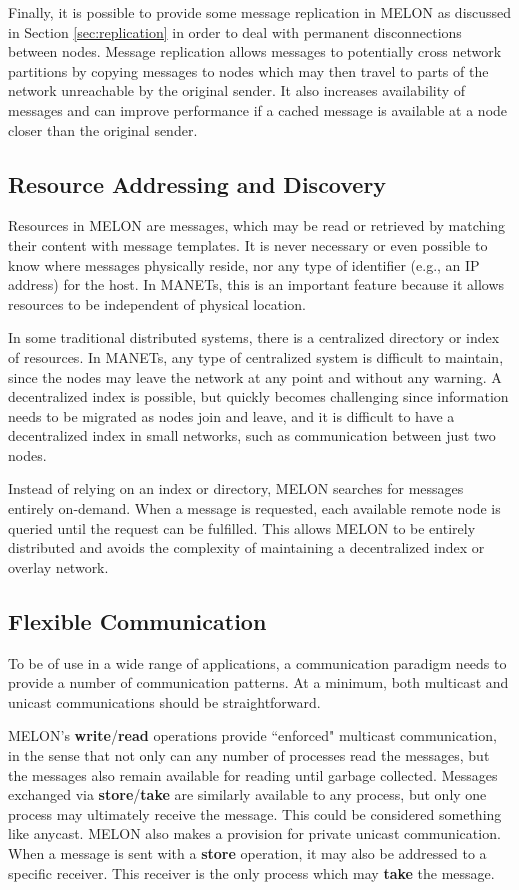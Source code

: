 Finally, it is possible to provide some message replication in MELON as discussed in Section \ref{sec:replication} in order to deal with permanent disconnections between nodes. Message replication allows messages to potentially cross network partitions by copying messages to nodes which may then travel to parts of the network unreachable by the original sender. It also increases availability of messages and can improve performance if a cached message is available at a node closer than the original sender.

\subsection{Resource Addressing and Discovery}

Resources in MELON are messages, which may be read or retrieved by matching their content with message templates. It is never necessary or even possible to know where messages physically reside, nor any type of identifier (e.g., an IP address) for the host. In MANETs, this is an important feature because it allows resources to be independent of physical location.

In some traditional distributed systems, there is a centralized directory or index of resources. In MANETs, any type of centralized system is difficult to maintain, since the nodes may leave the network at any point and without any warning. A decentralized index is possible, but quickly becomes challenging since information needs to be migrated as nodes join and leave, and it is difficult to have a decentralized index in small networks, such as communication between just two nodes.

Instead of relying on an index or directory, MELON searches for messages entirely on-demand. When a message is requested, each available remote node is queried until the request can be fulfilled. This allows MELON to be entirely distributed and avoids the complexity of maintaining a decentralized index or overlay network.

\subsection{Flexible Communication}

To be of use in a wide range of applications, a communication paradigm needs to provide a number of communication patterns. At a minimum, both multicast and unicast communications should be straightforward.

MELON's \textbf{write}/\textbf{read} operations provide ``enforced" multicast communication, in the sense that not only can any number of processes read the messages, but the messages also remain available for reading until garbage collected. Messages exchanged via \textbf{store}/\textbf{take} are similarly available to any process, but only one process may ultimately receive the message. This could be considered something like anycast. MELON also makes a provision for private unicast communication. When a message is sent with a \textbf{store} operation, it may also be addressed to a specific receiver. This receiver is the only process which may \textbf{take} the message.


